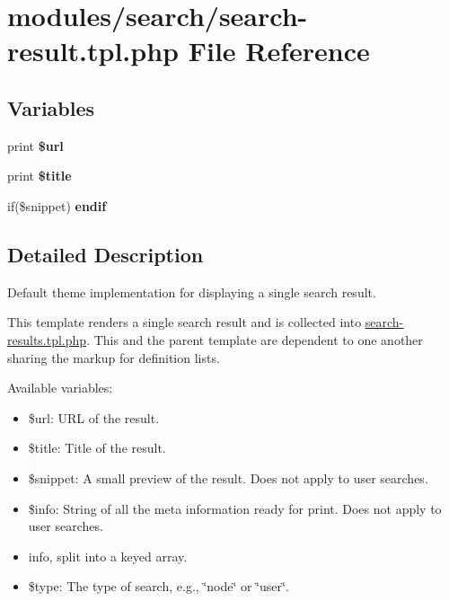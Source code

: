 \hypertarget{search-result_8tpl_8php}{
\section{modules/search/search-result.tpl.php File Reference}
\label{search-result_8tpl_8php}
}
\subsection*{Variables}
\begin{CompactItemize}
\item 
\hypertarget{search-result_8tpl_8php_d6261d93a9597f207ed9f915d0296c35}{
print \textbf{\$url}}
\label{search-result_8tpl_8php_d6261d93a9597f207ed9f915d0296c35}

\item 
\hypertarget{search-result_8tpl_8php_ec2795512d255332f57cacd930a090b4}{
print \textbf{\$title}}
\label{search-result_8tpl_8php_ec2795512d255332f57cacd930a090b4}

\item 
\hypertarget{search-result_8tpl_8php_81c60d87f7d85467649ef1a23ca2ca36}{
if(\$snippet) \textbf{endif}}
\label{search-result_8tpl_8php_81c60d87f7d85467649ef1a23ca2ca36}

\end{CompactItemize}


\subsection{Detailed Description}
Default theme implementation for displaying a single search result.

This template renders a single search result and is collected into \hyperlink{search-results_8tpl_8php}{search-results.tpl.php}. This and the parent template are dependent to one another sharing the markup for definition lists.

Available variables:\begin{itemize}
\item \$url: URL of the result.\item \$title: Title of the result.\item \$snippet: A small preview of the result. Does not apply to user searches.\item \$info: String of all the meta information ready for print. Does not apply to user searches.\item {}
info, split into a keyed array.\item \$type: The type of search, e.g., \char`\"{}node\char`\"{} or \char`\"{}user\char`\"{}.\end{itemize}


